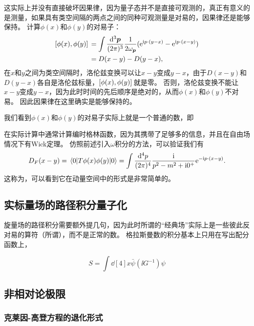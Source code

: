 这实际上并没有直接破坏因果律，因为量子态并不是直接可观测的，真正有意义的是测量，如果具有类空间隔的两点之间的同种可观测量是对易的，因果律还是能够保持。
计算$\phi(x)$和$\phi(y)$的对易子：
\begin{equation}
    \begin{aligned}
        \comm*{\phi(x)}{\phi(y)} &= \int \frac{\dd[3]{\vb*{p}}}{(2\pi)^3} \frac{1}{2 \omega_{\vb*{p}}} (\ee^{\ii p \cdot (y - x)} - \ee^{\ii p \cdot (x - y)}) \\
        &= D(x-y) - D(y-x),
    \end{aligned}
\end{equation}
在$x$和$y$之间为类空间隔时，洛伦兹变换可以让$x-y$变成$y-x$，由于$D(x-y)$和$D(y-x)$各自是洛伦兹标量，$\comm*{\phi(x)}{\phi(y)}$就是零。
否则，洛伦兹变换不能让$x-y$变成$y-x$，因为此时时间的先后顺序是绝对的，从而$\phi(x)$和$\phi(y)$不对易。
因此因果律在这里确实是能够保持的。

我们看到$\phi(x)$和$\phi(y)$的对易子实际上就是一个普通的数，即

在实际计算中通常计算编时格林函数，因为其携带了足够多的信息，并且在自由场情况下有Wick定理。
仿照前述引入$\omega$积分的方法，可以验证我们有
\begin{equation}
    D_F(x-y) = \mel*{0}{T \phi(x) \phi(y)}{0} = \int \frac{\dd[4]{p}}{(2\pi)^4} \frac{\mathrm{i}}{p^2 - m^2 + \mathrm{i} 0^+} \mathrm{e}^{- \mathrm{i} p \cdot (x - y)}.
\end{equation}
这称为，可以看到它在动量空间中的形式是非常简单的。

\subsection{实标量场的路径积分量子化}

旋量场的路径积分需要额外提几句，因为此时所谓的“经典场”实际上是一些彼此反对易的算符（所谓），而不是正常的数。
格拉斯曼数的积分基本上只用在写出配分函数上，

\[
    S = \int \dd[4]{x} \bar{\psi} (\ii G^{-1}) \psi
\]

\subsection{非相对论极限}

\subsubsection{克莱因-高登方程的退化形式}\label{sec:sch-eq-from-kg}

